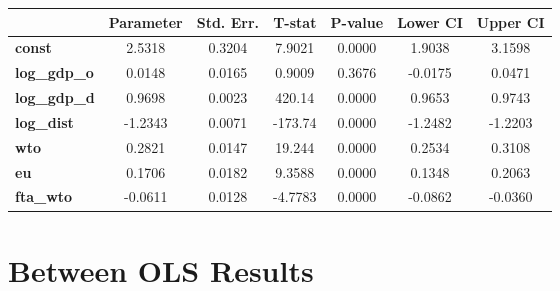 \documentclass{article}
\begin{document}
\begin{center}
\begin{tabular}{lclc}
\end{tabular}
\begin{tabular}{lcccccc}
                     & \textbf{Parameter} & \textbf{Std. Err.} & \textbf{T-stat} & \textbf{P-value} & \textbf{Lower CI} & \textbf{Upper CI}  \\
\midrule
\textbf{const}       &       2.5318       &       0.3204       &      7.9021     &      0.0000      &       1.9038      &       3.1598       \\
\textbf{log\_gdp\_o} &       0.0148       &       0.0165       &      0.9009     &      0.3676      &      -0.0175      &       0.0471       \\
\textbf{log\_gdp\_d} &       0.9698       &       0.0023       &      420.14     &      0.0000      &       0.9653      &       0.9743       \\
\textbf{log\_dist}   &      -1.2343       &       0.0071       &     -173.74     &      0.0000      &      -1.2482      &      -1.2203       \\
\textbf{wto}         &       0.2821       &       0.0147       &      19.244     &      0.0000      &       0.2534      &       0.3108       \\
\textbf{eu}          &       0.1706       &       0.0182       &      9.3588     &      0.0000      &       0.1348      &       0.2063       \\
\textbf{fta\_wto}    &      -0.0611       &       0.0128       &     -4.7783     &      0.0000      &      -0.0862      &      -0.0360       \\
\bottomrule
\end{tabular}
\end{center}\section*{Between OLS Results}
\end{document}
